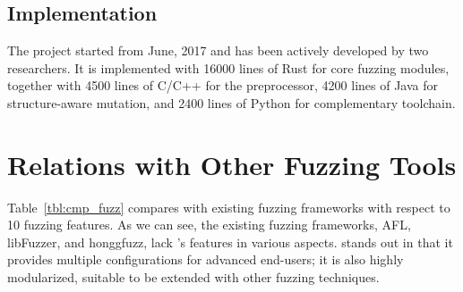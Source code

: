 %
%
%
 

\subsection{Implementation}\label{sec:fot-impl}

The {\FOT} project started from June, 2017 and has been actively developed by two researchers. It is implemented with 16000 lines of Rust for core fuzzing modules, together with 4500 lines of C/C++ for the preprocessor, 4200 lines of Java for structure-aware mutation, and 2400 lines of Python for complementary toolchain.
  

\section{Relations with Other Fuzzing Tools}





Table~\ref{tbl:cmp_fuzz} compares {\FOT} with existing fuzzing frameworks with respect to 10 fuzzing features. As we can see, the existing fuzzing frameworks, AFL, libFuzzer, and honggfuzz, lack \FOT's features in various aspects. {\FOT} stands out in that it provides multiple configurations for advanced end-users; it is also highly modularized, suitable to be extended with other fuzzing techniques.

